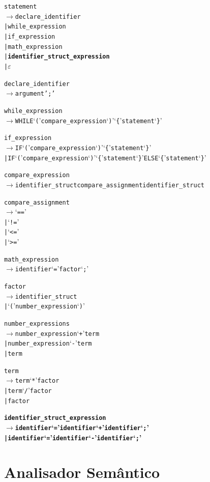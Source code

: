 \documentclass[12pt]{article}
\begin{document}
\begin{alltt}{\footnotesize
statement
   \(\to\) declare\_identifier
    | while\_expression
    | if\_expression
    | math\_expression
    | \textbf{identifier\_struct\_expression}
    | \(\varepsilon\)
		
declare\_identifier
   \(\to\) argument ';' 
		
while\_expression
   \(\to\) WHILE `(' compare\_expression `)' `\{' statement `\}'

if\_expression
   \(\to\) IF `(' compare\_expression `)' `\{' statement `\}'
    | IF `(' compare\_expression `)' `\{' statement `\}' ELSE `\{' statement `\}'
    
compare\_expression
   \(\to\) identifier\_struct compare\_assignment identifier\_struct
    
compare\_assignment
   \(\to\) `=='
    | `!='
    | `<='
    | `>='

math\_expression
   \(\to\) identifier `=' factor `;'

factor
   \(\to\) identifier\_struct
    | `(' number\_expression `)' 

number\_expressions
   \(\to\) number\_expression `+' term
    | number\_expression `-' term
    | term
    
term
   \(\to\) term `*' factor
    | term `/' factor
    | factor
    
\textbf{
identifier\_struct\_expression
   \(\to\) identifier `=' identifier `+' identifier `;'
    | identifier `=' identifier `-' identifier `;'
}		
}\end{alltt}





\section{Analisador Semântico}
\end{document}
